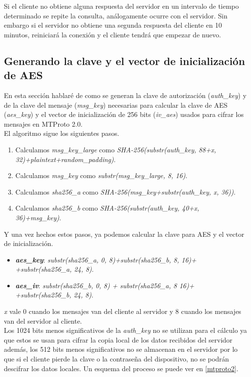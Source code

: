 Si el cliente no obtiene alguna respuesta del servidor en un intervalo de tiempo determinado se repite la consulta, análogamente ocurre con el servidor. Sin embargo si el servidor no obtiene una segunda respuesta del cliente en 10 minutos, reiniciará la conexión y el cliente tendrá que empezar de nuevo.

\subsection{Generando la clave y el vector de inicialización de AES}
En esta sección hablaré de como se generan la clave de autorización (\emph{auth\_key}) y de la clave del mensaje (\emph{msg\_key}) necesarias para calcular la clave de AES (\emph{aes\_key}) y el vector de inicialización de 256 bits (\emph{iv\_aes}) usados para cifrar los mensajes en MTProto 2.0.\\
El algoritmo sigue los siguientes pasos.
\begin{enumerate}
	\item Calculamos \emph{msg\_key\_large} como \emph{SHA-256(substr(auth\_key, 88+x, 32)+plaintext+random\_padding)}.
	\item Calculamos \emph{msg\_key} como \emph{substr(msg\_key\_large, 8, 16)}.
	\item Calculamos \emph{sha256\_a} como \emph{SHA-256(msg\_key+substr(auth\_key, x, 36))}.
	\item Calculamos \emph{sha256\_b} como \emph{SHA-256(substr(auth\_key, 40+x,\\ 36)+msg\_key)}.
\end{enumerate}
Y una vez hechos estos pasos, ya podemos calcular la clave para AES y el vector de inicialización.
\begin{itemize}
	\item \textbf{\emph{aes\_key}}: \emph{substr(sha256\_a, 0, 8)+substr(sha256\_b, 8, 16)+\\+substr(sha256\_a, 24, 8)}.
	\item \textbf{\emph{aes\_iv}}: \emph{substr(sha256\_b, 0, 8) + substr(sha256\_a, 8 16)+\\+substr(sha256\_b, 24, 8)}.
\end{itemize}
\emph{x} vale 0 cuando los mensajes van del cliente al servidor y 8 cuando los mensajes van del servidor al cliente.\\
Los 1024 bits menos significativos de la \emph{auth\_key} no se utilizan para el cálculo ya que estos se usan para cifrar la copia local de los datos recibidos del servidor además, los 512 bits menos significativos no se almacenan en el servidor por lo que si el cliente pierde la clave o la contraseña del dispositivo, no se podrán descifrar los datos locales. Un esquema del proceso se puede ver en \ref{mtproto2}.
